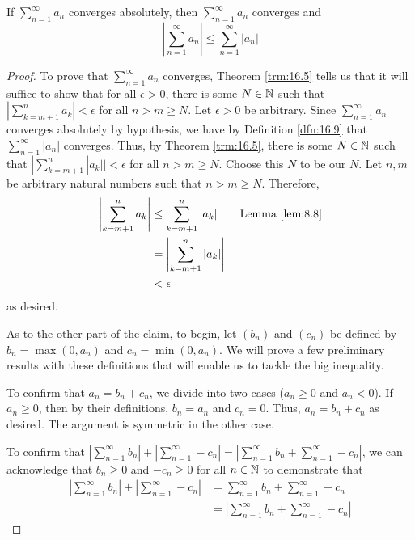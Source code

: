 \documentclass[../main.tex]{subfiles}
\begin{document}
\begin{theorem}\label{trm:16.11}
    If $\sum_{n=1}^\infty a_n$ converges absolutely, then $\sum_{n=1}^\infty a_n$ converges and
    \begin{equation*}
        \left| \sum_{n=1}^\infty a_n \right| \leq \sum_{n=1}^\infty|a_n|
    \end{equation*}
    \begin{proof}
        To prove that $\sum_{n=1}^\infty a_n$ converges, Theorem \ref{trm:16.5} tells us that it will suffice to show that for all $\epsilon>0$, there is some $N\in\mathbb{N}$ such that $|\sum_{k=m+1}^na_k|<\epsilon$ for all $n>m\geq N$. Let $\epsilon>0$ be arbitrary. Since $\sum_{n=1}^\infty a_n$ converges absolutely by hypothesis, we have by Definition \ref{dfn:16.9} that $\sum_{n=1}^\infty|a_n|$ converges. Thus, by Theorem \ref{trm:16.5}, there is some $N\in\mathbb{N}$ such that $|\sum_{k=m+1}^n|a_k||<\epsilon$ for all $n>m\geq N$. Choose this $N$ to be our $N$. Let $n,m$ be arbitrary natural numbers such that $n>m\geq N$. Therefore,
        \begin{align*}
            \left| \sum_{k=m+1}^na_k \right| &\leq \sum_{k=m+1}^n|a_k|\tag*{Lemma \ref{lem:8.8}}\\
            &= \left| \sum_{k=m+1}^n|a_k| \right|\\
            &< \epsilon
        \end{align*}
        as desired.\par\smallskip
        As to the other part of the claim, to begin, let $(b_n)$ and $(c_n)$ be defined by $b_n=\max(0,a_n)$ and $c_n=\min(0,a_n)$. We will prove a few preliminary results with these definitions that will enable us to tackle the big inequality.\par
        To confirm that $a_n=b_n+c_n$, we divide into two cases ($a_n\geq 0$ and $a_n<0$). If $a_n\geq 0$, then by their definitions, $b_n=a_n$ and $c_n=0$. Thus, $a_n=b_n+c_n$ as desired. The argument is symmetric in the other case.\par
        To confirm that $|\sum_{n=1}^\infty b_n|+|\sum_{n=1}^\infty -c_n|=|\sum_{n=1}^\infty b_n+\sum_{n=1}^\infty -c_n|$, we can acknowledge that $b_n\geq 0$ and $-c_n\geq 0$ for all $n\in\mathbb{N}$ to demonstrate that
        \begin{align*}
            \left| \sum_{n=1}^\infty b_n \right|+\left| \sum_{n=1}^\infty -c_n \right| &= \sum_{n=1}^\infty b_n+\sum_{n=1}^\infty -c_n\\
            &= \left| \sum_{n=1}^\infty b_n+\sum_{n=1}^\infty -c_n \right|
        \end{align*}\par

\end{proof}
\end{theorem}
\end{document}

